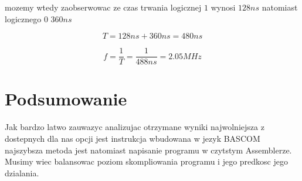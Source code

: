 \documentclass{article}
\begin{document}
mozemy wtedy zaobserwowac ze czas trwania logicznej $1$ wynosi $128ns$ natomiast logicznego $0$ $360ns$

\begin{equation}
  T = 128ns + 360ns = 480ns
\end{equation}


\begin{equation}
  f = \frac{1}{T} = \frac{1}{488ns} = 2.05MHz
\end{equation}


\section{Podsumowanie}

Jak bardzo latwo zauwazyc analizujac otrzymane wyniki najwolniejsza z dostepnych dla nas opcji jest instrukcja  wbudowana w jezyk BASCOM najszybsza metoda jest natomiast napisanie programu w czytstym Assemblerze. Musimy wiec balansowac poziom skompliowania programu i jego predkosc jego dzialania.
\end{document}
